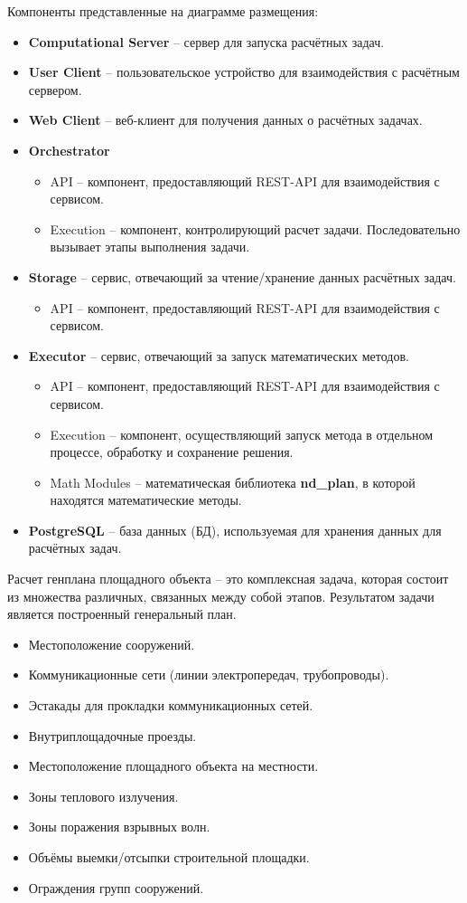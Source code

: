 \noindent Компоненты представленные на диаграмме размещения:
\begin{itemize}
	\item \textbf{Computational Server} -- сервер для запуска расчётных задач.
	\item \textbf{User Client} -- пользовательское устройство для взаимодействия с расчётным сервером.
	\item \textbf{Web Client} -- веб-клиент для получения данных о расчётных задачах.
	\item \textbf{Orchestrator}
	\begin{itemize}
		\item API -- компонент, предоставляющий REST-API для взаимодействия с сервисом.
		\item Execution -- компонент, контролирующий расчет задачи. Последовательно вызывает этапы выполнения задачи.
	\end{itemize}
	\item \textbf{Storage} -- сервис, отвечающий за чтение/хранение данных расчётных задач.
	\begin{itemize}
		\item API -- компонент, предоставляющий REST-API для взаимодействия с сервисом.
	\end{itemize}
	\item \textbf{Executor} -- сервис, отвечающий за запуск математических методов.
	\begin{itemize}
		\item API -- компонент, предоставляющий REST-API для взаимодействия с сервисом.
		\item Execution -- компонент, осуществляющий запуск метода в отдельном процессе, обработку и сохранение решения.
		\item Math Modules -- математическая библиотека \textbf{nd\_plan}, в которой находятся математические методы.
	\end{itemize}
	\item \textbf{PostgreSQL} -- база данных (БД), используемая для хранения данных для расчётных задач.
\end{itemize}


Расчет генплана площадного объекта -- это комплексная задача, которая состоит из множества различных,
связанных между собой этапов. Результатом задачи является построенный генеральный план.
\begin{itemize}
	\item Местоположение сооружений.
	\item Коммуникационные сети (линии электропередач, трубопроводы).
	\item Эстакады для прокладки коммуникационных сетей.
	\item Внутриплощадочные проезды.
	\item Местоположение площадного объекта на местности.
	\item Зоны теплового излучения.
	\item Зоны поражения взрывных волн.
	\item Объёмы выемки/отсыпки строительной площадки.
	\item Ограждения групп сооружений.
\end{itemize}

